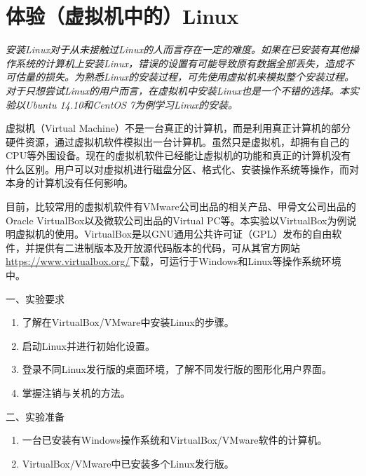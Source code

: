 \chapter{体验（虚拟机中的）Linux}

{\itshape
安装Linux对于从未接触过Linux的人而言存在一定的难度。如果在已安装有其他操作系统的计算机上安装Linux，错误的设置有可能导致原有数据全部丢失，造成不可估量的损失。为熟悉Linux的安装过程，可先使用虚拟机来模拟整个安装过程。对于只想尝试Linux的用户而言，在虚拟机中安装Linux也是一个不错的选择。本实验以Ubuntu 14.10和CentOS 7为例学习Linux的安装。

虚拟机（Virtual Machine）不是一台真正的计算机，而是利用真正计算机的部分硬件资源，通过虚拟机软件模拟出一台计算机。虽然只是虚拟机，却拥有自己的CPU等外围设备。现在的虚拟机软件已经能让虚拟机的功能和真正的计算机没有什么区别。用户可以对虚拟机进行磁盘分区、格式化、安装操作系统等操作，而对本身的计算机没有任何影响。

目前，比较常用的虚拟机软件有VMware公司出品的相关产品、甲骨文公司出品的Oracle VirtualBox以及微软公司出品的Virtual PC等。本实验以VirtualBox为例说明虚拟机的使用。VirtualBox是以GNU通用公共许可证（GPL）发布的自由软件，并提供有二进制版本及开放源代码版本的代码，可从其官方网站\href{https://www.virtualbox.org/}{https://www.virtualbox.org/}下载，可运行于Windows和Linux等操作系统环境中。
}

\vspace{0.2in}
\noindent
一、实验要求
\begin{enumerate}
  \item 了解在VirtualBox/VMware中安装Linux的步骤。
  \item 启动Linux并进行初始化设置。
  \item 登录不同Linux发行版的桌面环境，了解不同发行版的图形化用户界面。
  \item 掌握注销与关机的方法。
\end{enumerate}

\vspace{0.2in}
\noindent
二、实验准备
\begin{enumerate}
  \item 一台已安装有Windows操作系统和VirtualBox/VMware软件的计算机。
  \item VirtualBox/VMware中已安装多个Linux发行版。
\end{enumerate}


